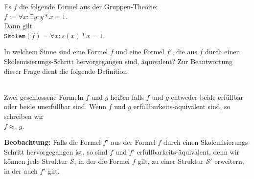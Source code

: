 \example
Es $f$ die folgende Formel aus der Gruppen-Theorie:
\\[0.2cm]
\hspace*{1.3cm}
$f := \forall x: \exists y: y * x = 1$. 
\\[0.2cm]
Dann gilt
\\[0.2cm]
\hspace*{1.3cm}
$\mathtt{Skolem}(f) = \forall x : s(x) * x = 1$.  \eox

\noindent
In welchem Sinne sind eine Formel $f$ und eine Formel $f'$, die aus $f$ durch einen 
Skolem\-isierungs-Schritt hervorgegangen sind, äquivalent?  Zur Beantwortung dieser Frage
dient die folgende Definition. 

\begin{Definition} \hspace*{\fill} \\
   Zwei geschlossene Formeln $f$ und $g$ heißen 
   falls $f$ und $g$ entweder beide erfüllbar oder beide unerfüllbar sind.
   Wenn $f$ und $g$ erfüllbarkeits-äquivalent sind, so schreiben wir \\[0.2cm]
   \hspace*{1.3cm} $f \approx_e g$.
\eox
\end{Definition}

\noindent
\textbf{Beobachtung:}
Falls die Formel $f'$ aus der Formel $f$ durch einen Skolemisierungs-Schritt 
hervorgegangen ist, so sind $f$ und $f'$ erfüllbarkeits-äquivalent, denn wir können jede Struktur
$\mathcal{S}$, in der die Formel $f$ gilt, zu einer Struktur $\mathcal{S}'$ erweitern, in der auch $f'$ gilt.
\eox

